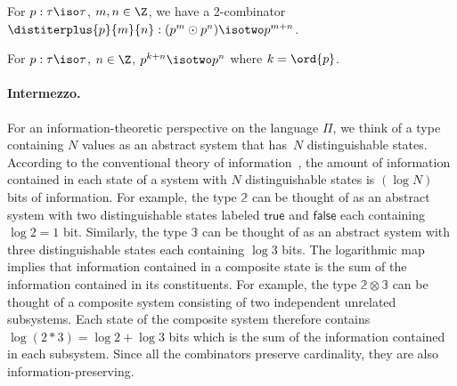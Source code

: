 
\begin{lemma}
\label{lem:distiterplus}
  For $p : \tau\iso\tau$, $m,n\in\Z$, we have a 2-combinator
  $\distiterplus{p}{m}{n} : (p^m \odot p^n) \isotwo p ^{m + n}$.
\end{lemma}

\begin{lemma}
  For $p : \tau \iso \tau$, $n \in \Z$, $p^{k + n} \isotwo p^n$ where
  $k = \ord{p}$.
\end{lemma}

\paragraph{Intermezzo.} For an information-theoretic perspective on
the language $\Pi$, we think of a type containing $N$ values as an
abstract system that has~$N$ distinguishable states. According to the
conventional theory of information~\cite{Shannon1948}, the amount of
information contained in each state of a system with $N$
distinguishable states is $(\log N)$ bits of information. For example,
the type $\mathbb{2}$ can be thought of as an abstract system with
two distinguishable states labeled $\mathsf{true}$ and
$\mathsf{false}$ each containing $\log 2 = 1$ bit. Similarly, the type
$\mathbb{3}$ can be thought of as an abstract system with three
distinguishable states each containing $\log 3$ bits. The logarithmic
map implies that information contained in a composite state is the sum
of the information contained in its constituents. For example, the
type $\mathbb{2} \otimes \mathbb{3}$ can be thought of a composite
system consisting of two independent unrelated subsystems. Each state
of the composite system therefore contains
$\log (2 * 3) = \log 2 + \log 3$ bits which is the sum of the
information contained in each subsystem. Since all the combinators
preserve cardinality, they are also information-preserving.

